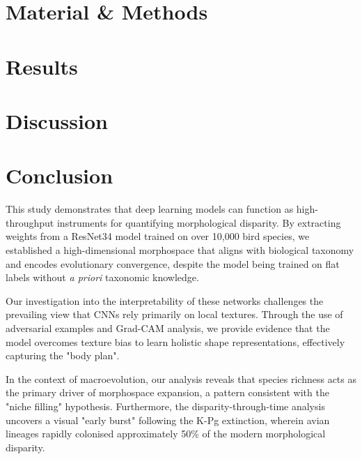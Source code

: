 \documentclass[pdflatex]{sn-jnl}
\begin{document}

\section{Material \& Methods}\label{sec:masterial-methods}



\section{Results}\label{sec:results}



\section{Discussion}\label{sec:discussion}



\section{Conclusion}\label{sec:conclusion}

This study demonstrates that deep learning models can function as high-throughput instruments
for quantifying morphological disparity. By extracting weights from a ResNet34 model trained
on over 10,000 bird species, we established a high-dimensional morphospace that aligns with
biological taxonomy and encodes evolutionary convergence,
despite the model being trained on flat labels without \textit{a priori} taxonomic knowledge.

Our investigation into the interpretability of these networks challenges the prevailing
view that CNNs rely primarily on local textures. Through the use of adversarial examples
and Grad-CAM analysis, we provide evidence that the model overcomes texture bias
to learn holistic shape representations, effectively capturing the "body plan".

In the context of macroevolution, our analysis reveals that species richness acts as the
primary driver of morphospace expansion, a pattern consistent with the "niche filling" hypothesis.
Furthermore, the disparity-through-time analysis uncovers a visual "early burst"
following the K-Pg extinction, wherein avian lineages rapidly colonised approximately 50\% of
the modern morphological disparity.
\end{document}
